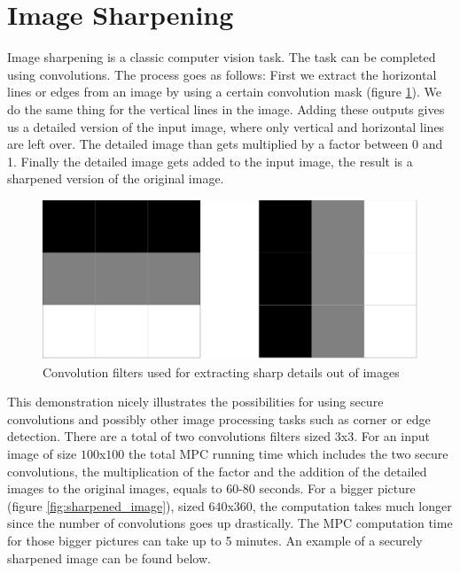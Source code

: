 \section{Image Sharpening}
Image sharpening is a classic computer vision task. The task can be completed using convolutions. The process goes as follows: First we extract the horizontal lines or edges from an image by using a certain convolution mask (figure \ref{fig:sharp_mask}). We do the same thing for the vertical lines in the image. Adding these outputs gives us a detailed version of the input image, where only vertical and horizontal lines are left over. The detailed image than gets multiplied by a factor between 0 and 1. Finally the detailed image gets added to the input image, the result is a sharpened version of the original image.

\begin{figure}[H]
  \includegraphics[scale=0.2]{fig/sharp_mask.png}
  \centering
  \caption{Convolution filters used for extracting sharp details out of images}
  \label{fig:sharp_mask}
\end{figure}

This demonstration nicely illustrates the possibilities for using secure convolutions and possibly other image processing tasks such as corner or edge detection. There are a total of two convolutions filters sized $3$x$3$. For an input image of size $100$x$100$ the total MPC running time which includes the two secure convolutions, the multiplication of the factor and the addition of the detailed images to the original images, equals to 60-80 seconds. For a bigger picture (figure \ref{fig:sharpened_image}), sized $640$x$360$, the computation takes much longer since the number of convolutions goes up drastically. The MPC computation time for those bigger pictures can take up to 5 minutes. An example of a securely sharpened image can be found below.

